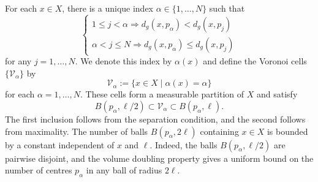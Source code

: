 \documentclass[a4paper,oneside,12pt]{amsart}
\theoremstyle{plain}
\theoremstyle{definition}
\theoremstyle{remark}
\newcommand{\voronoicell}{\mathcal{V}}
\begin{document}
For each $x\in X$, there is a unique index $\alpha \in \{1,\ldots,N\}$ such that
\begin{equation}
  \begin{cases}
    1 \le j < \alpha \Longrightarrow d_g(x,p_{\alpha}) < d_g(x,p_j) \\
    \alpha < j \le N \Longrightarrow d_g(x,p_{\alpha}) \le d_g(x,p_j)
  \end{cases}
\end{equation}
for any $j = 1,\dots,N$.
We denote this index by $\alpha(x)$ and define the Voronoi cells $\{\voronoicell_{\alpha}\}$ by
\begin{equation}
  \voronoicell_{\alpha} := \{ x\in X \mid \alpha(x)=\alpha\}
\end{equation}
for each $\alpha = 1,\dots,N$.
These cells form a measurable partition of $X$ and satisfy
\begin{equation}
  B(p_\alpha,\ell/2) \subset \voronoicell_\alpha \subset B(p_\alpha,\ell).
\end{equation}
The first inclusion follows from the separation condition, and the second follows from maximality.
The number of balls $B(p_{\alpha},2\ell)$ containing $x \in X$ is bounded by a constant independent of $x$ and $\ell$.
Indeed, the balls $B(p_{\alpha},\ell/2)$ are pairwise disjoint, and the volume doubling property gives a uniform bound on the number of centres $p_{\alpha}$ in any ball of radius $2\ell$.
\end{document}
